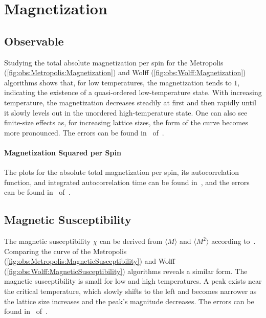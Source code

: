 \section{Magnetization}\label{sec:res:magnet}
	\subsection{Observable}\label{sec:res:magnet:observable}
		Studying the total absolute magnetization per spin for the Metropolis (\cref{fig:obs:Metropolis:Magnetization}) and Wolff (\cref{fig:obs:Wolff:Magnetization}) algorithms shows that, for low temperatures, the magnetization tends to $1$, indicating the existence of a quasi-ordered low-temperature state. With increasing temperature, the magnetization decreases steadily at first and then rapidly until it slowly levels out in the unordered high-temperature state. One can also see finite-size effects as, for increasing lattice sizes, the form of the curve becomes more pronounced. The errors can be found in~ of~.
		
		\paragraph{Magnetization Squared per Spin}\label{sec:res:magnetsquare} The plots for the absolute total magnetization per spin, its autocorrelation function, and integrated autocorrelation time can be found in~, and the errors can be found in~ of~.
	
	\subsection{Magnetic Susceptibility}\label{sec:res:xs}
		The magnetic susceptibility $\chi$ can be derived from $\langle M \rangle$ and $\langle M^2 \rangle$ according to~.  Comparing the curve of the Metropolis (\cref{fig:obs:Metropolis:MagneticSusceptibility}) and Wolff (\cref{fig:obs:Wolff:MagneticSusceptibility}) algorithms reveals a similar form. The magnetic susceptibility is small for low and high temperatures. A peak exists near the critical temperature, which slowly shifts to the left and becomes narrower as the lattice size increases and the peak's magnitude decreases. The errors can be found in~ of~.
		

